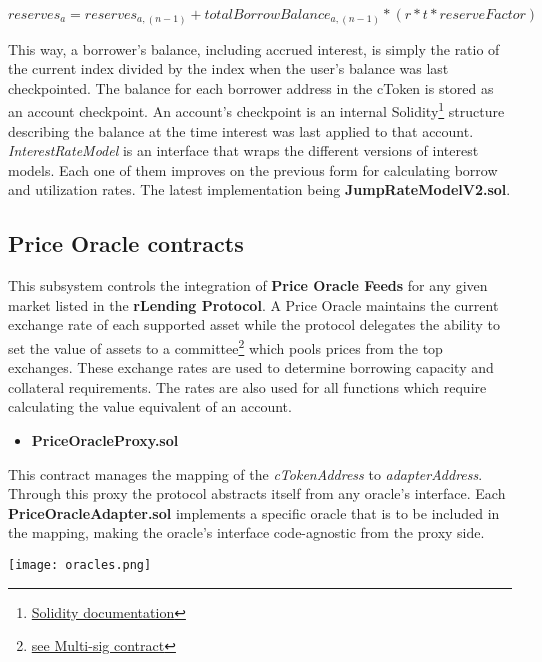 \documentclass{article}
\begin{document}
\begin{center}
$reserves_{a}= reserves_{a,(n-1)}+ totalBorrowBalance_{a,(n-1)}*(r*t*reserveFactor)$
\end{center}

This way, a borrower's balance, including accrued interest, is simply the ratio of the current index divided by the index when the user's balance was last checkpointed. The balance for each borrower address in the cToken is stored as an account checkpoint. An account's checkpoint is an internal Solidity\footnote{\href{https://docs.soliditylang.org/en/v0.8.1/}{Solidity documentation}} structure describing the balance at the time interest was last applied to that account.
\\ 
\textit{InterestRateModel} is an interface that wraps the different versions of interest models. Each one of them improves on the previous form for calculating borrow and utilization rates. The latest implementation being \textbf{JumpRateModelV2.sol}.


\subsection{Price Oracle contracts}
This subsystem controls the integration of \textbf{Price Oracle Feeds} for any given market listed in the \textbf{rLending Protocol}. A Price Oracle maintains the current exchange rate of each supported asset while the protocol delegates the ability to set the value of assets to a committee\footnote{\href{https://rlending.app/docs/security}{see Multi-sig contract}} which pools prices from the top exchanges. These exchange rates are used to determine borrowing capacity and collateral requirements. The rates are also used for all functions which require calculating the value equivalent of an account.

\begin{itemize}
\item\textbf{PriceOracleProxy.sol}
\end{itemize}

This contract manages the mapping of the \textit{cTokenAddress} to \textit{adapterAddress}. Through this proxy the protocol abstracts itself from any oracle's interface. Each \textbf{PriceOracleAdapter.sol} implements a specific oracle that is to be included in the mapping, making the oracle's interface code-agnostic from the proxy side.

\begin{center}
\texttt{[image: oracles.png]}
\end{center}
\end{document}

